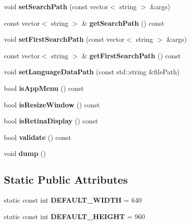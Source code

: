\begin{DoxyCompactItemize}
void {\bfseries set\+Search\+Path} (const vector$<$ string $>$ \&args)
\item 
\mbox{\label{classProjectConfig_ad1c43f871cd3d95e7ee0a04f0279f654}} 
const vector$<$ string $>$ \& {\bfseries get\+Search\+Path} () const
\item 
\mbox{\label{classProjectConfig_ad0878b745a111fdd1e125a5023b0cf77}} 
void {\bfseries set\+First\+Search\+Path} (const vector$<$ string $>$ \&args)
\item 
\mbox{\label{classProjectConfig_a3c46dfbffa20327389bfe53532101b94}} 
const vector$<$ string $>$ \& {\bfseries get\+First\+Search\+Path} () const
\item 
\mbox{\label{classProjectConfig_a0b3380ef217cb66a2ab6af3b47957d06}} 
void {\bfseries set\+Language\+Data\+Path} (const std\+::string \&file\+Path)
\item 
\mbox{\label{classProjectConfig_afa43c9d2cf01140e4aa4003c659a46f4}} 
bool {\bfseries is\+App\+Menu} () const
\item 
\mbox{\label{classProjectConfig_a7716cb58c4d9ab5d6b3ffe80a0d1ae53}} 
bool {\bfseries is\+Resize\+Window} () const
\item 
\mbox{\label{classProjectConfig_ab30b7ce48c01b65aefca0e0c8f8f91cf}} 
bool {\bfseries is\+Retina\+Display} () const
\item 
\mbox{\label{classProjectConfig_a5bfdb7343ddc67eb513752582e684602}} 
bool {\bfseries validate} () const
\item 
\mbox{\label{classProjectConfig_af3ce22b50510447ce5853c673db7faba}} 
void {\bfseries dump} ()
\end{DoxyCompactItemize}
\subsection*{Static Public Attributes}
\begin{DoxyCompactItemize}
\item 
\mbox{\label{classProjectConfig_aad9dcad5162007a037eda9c81df73db5}} 
static const int {\bfseries D\+E\+F\+A\+U\+L\+T\+\_\+\+W\+I\+D\+TH} = 640
\item 
\mbox{\label{classProjectConfig_ae3de1626e71284ae8caedd971528bae3}} 
static const int {\bfseries D\+E\+F\+A\+U\+L\+T\+\_\+\+H\+E\+I\+G\+HT} = 960
\end{DoxyCompactItemize}


